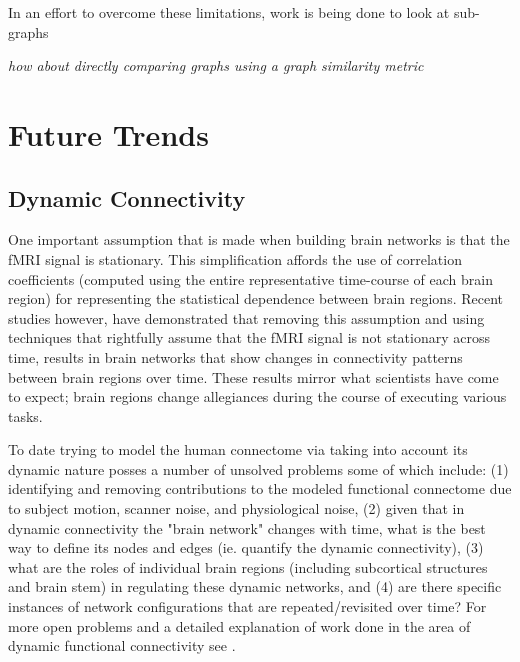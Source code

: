  In an effort to overcome these limitations, work is being done to look at sub-graphs \cite{}   

\textit{how about directly comparing graphs using a graph similarity metric}


\section*{Future Trends}

\subsection*{Dynamic Connectivity}
One important assumption that is made when building brain networks is that the fMRI signal is stationary. This simplification affords the use of correlation coefficients (computed using the entire representative time-course of each brain region) for representing the statistical dependence between brain regions. Recent studies \cite{Hutchinson2013, Fu2013,} however, have demonstrated that removing this assumption and using techniques that rightfully assume that the fMRI signal is not stationary across time, results in brain networks that show changes in connectivity patterns between brain regions over time. These results mirror what scientists have come to expect; brain regions change allegiances during the course of executing various tasks.

To date trying to model the human connectome via taking into account its dynamic nature posses a number of unsolved problems \cite{Hutchinson2013} some of which include: (1) identifying and removing contributions to the modeled functional connectome due to subject motion, scanner noise, and physiological noise, (2) given that in dynamic connectivity the "brain network" changes with time, what is the best way to define its nodes and edges (ie. quantify the dynamic connectivity), (3) what are the roles of individual brain regions (including subcortical structures and brain stem) in regulating these dynamic networks, and (4) are there specific instances of network configurations that are repeated/revisited over time? For more open problems and a detailed explanation of work done in the area of dynamic functional connectivity see \cite{Hutchinson2013}.

